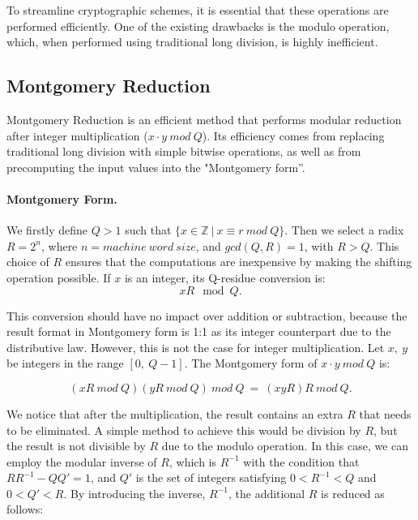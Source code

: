 \documentclass[11pt,
  titlepage=false,
  abstract=on,
]{scrreprt}
\begin{document}
To streamline cryptographic schemes, it is essential that these operations are performed efficiently. One of the existing drawbacks is the modulo operation, which, 
when performed using traditional long division, is highly inefficient.


\subsection{Montgomery Reduction}
Montgomery Reduction \cite{montgomery1985modular} is an efficient method that performs modular reduction after integer multiplication ($x \cdot y\ mod\ Q$).
Its efficiency comes from replacing traditional long division with simple bitwise operations, as well as from precomputing the input values into the "Montgomery form''.

\paragraph{Montgomery Form.} We firstly define $Q > 1$ such that $\{x \in \mathbb{Z}\ |\ x \equiv r\ mod\ Q\}$. Then we select a radix $R = 2^n$, where 
$n = machine\ word\ size$, and $gcd(Q, R) = 1$, with $R > Q$. This choice of $R$ ensures that the computations are inexpensive by making the shifting operation possible.
If $x$ is an integer, its Q-residue conversion is:
\begin{equation*}
  xR \mod Q. 
\end{equation*}

This conversion should have no impact over addition or subtraction, because the result format in Montgomery
form is 1:1 as its integer counterpart due to the distributive law.
However, this is not the case for integer multiplication. Let $x,\ y$ be integers in the range $[0,\ Q-1]$. The Montgomery form of $x\cdot y\ mod\ Q$ is:

\begin{equation*}
  (xR\ mod\ Q)(yR\ mod\ Q)\ mod\ Q\ =\ (xyR)R\ mod\ Q.
\end{equation*}

We notice that after the multiplication, the result contains an extra $R$ that needs to be eliminated. A simple method to achieve this would be division by $R$, but
the result is not divisible by $R$ due to the modulo operation. In this case, we can employ the modular inverse of $R$, which is $R^{-1}$ with the condition that $RR^{-1} - QQ' = 1$,
and $Q'$ is the set of integers satisfying  $0 < R^{-1} < Q$ and $0 < Q' < R$.
By introducing the inverse, $R^{-1}$, the additional $R$ is reduced as follows:
\end{document}
